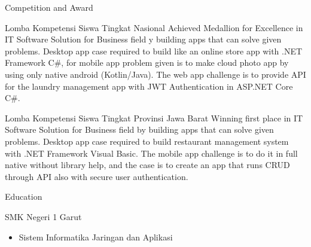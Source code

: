 \documentclass{article}
\newlength{\tabin}
\newlength{\secsep}
\newcommand{\lineunder}{\vspace*{-8pt} \\ \hspace*{-6pt} \hrulefill \\ \vspace*{-15pt}}
\newenvironment{tabbedsection}[1]{
  \begin{list}{}{
      \setlength{\itemsep}{0pt}
      \setlength{\labelsep}{0pt}
      \setlength{\labelwidth}{0pt}
      \setlength{\leftmargin}{\tabin}
      \setlength{\rightmargin}{\tabin}
      \setlength{\listparindent}{0pt}
      \setlength{\parsep}{0pt}
      \setlength{\parskip}{0pt}
      \setlength{\partopsep}{0pt}
      \setlength{\topsep}{#1}
    }
  \item[]
}{\end{list}}
\newenvironment{resume_section}[1]{
  \filbreak
  \vspace{2\secsep}
  \textsc{\large#1}
  \lineunder
  \begin{tabbedsection}{\secsep}
}{\end{tabbedsection}}
\newenvironment{resume_subsection}[2][]{
  \textbf{#2} \hfill {\footnotesize #1} \hspace{2em}
  \begin{tabbedsection}{0.5\secsep}
}{\end{tabbedsection}}
\newenvironment{subitems}{
  \renewcommand{\labelitemi}{-}
  \begin{itemize}
      \setlength{\labelsep}{1em}
}{\end{itemize}}
\begin{document}
\begin{resume_section}{Competition and Award}

    \begin{resume_subsection}[(October 2021)]{Lomba Kompetensi Siswa Tingkat Nasional}
        Achieved Medallion for Excellence in IT Software Solution for Business field y building apps that can solve given problems.
        Desktop app case required to build like an online store app with .NET Framework C\#, for mobile app problem given is to make cloud photo app by using only native android (Kotlin/Java).
        The web app challenge is to provide API for the laundry management app with JWT Authentication in ASP.NET Core C\#.
    \end{resume_subsection}

    \begin{resume_subsection}[(August 2021)]{Lomba Kompetensi Siswa Tingkat Provinsi Jawa Barat}
        Winning first place in IT Software Solution for Business field by building apps that can solve given problems.
        Desktop app case required to build restaurant management system with .NET Framework Visual Basic.
        The mobile app challenge is to do it in full native without library help, and the case is to create an app that runs CRUD through API also with secure user authentication.
    \end{resume_subsection}

\end{resume_section}

\begin{resume_section}{Education}
    \begin{resume_subsection}{SMK Negeri 1 Garut}
        \begin{subitems}
            \item Sistem Informatika Jaringan dan Aplikasi
        \end{subitems}
    \end{resume_subsection}
\end{resume_section}
\end{document}
